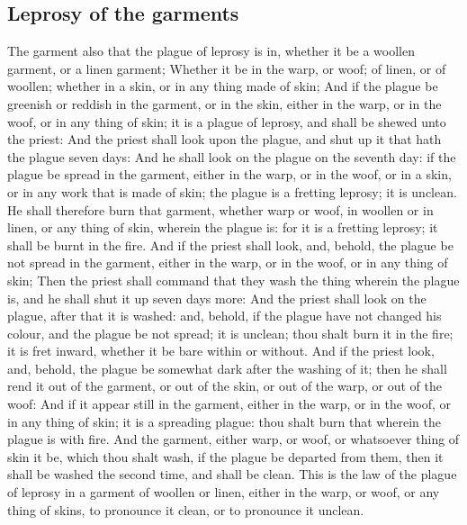 \begin{biblechapter}
\section*{Leprosy of the garments}
\verse The garment also that the plague of leprosy is in, whether it be a woollen garment, or a linen garment;
\verse Whether it be in the warp, or woof; of linen, or of woollen; whether in a skin, or in any thing made of skin;
\verse And if the plague be greenish or reddish in the garment, or in the skin, either in the warp, or in the woof, or in any thing of skin; it is a plague of leprosy, and shall be shewed unto the priest:
\verse And the priest shall look upon the plague, and shut up it that hath the plague seven days:
\verse And he shall look on the plague on the seventh day: if the plague be spread in the garment, either in the warp, or in the woof, or in a skin, or in any work that is made of skin; the plague is a fretting leprosy; it is unclean.
\verse He shall therefore burn that garment, whether warp or woof, in woollen or in linen, or any thing of skin, wherein the plague is: for it is a fretting leprosy; it shall be burnt in the fire.
\verse And if the priest shall look, and, behold, the plague be not spread in the garment, either in the warp, or in the woof, or in any thing of skin;
\verse Then the priest shall command that they wash the thing wherein the plague is, and he shall shut it up seven days more:
\verse And the priest shall look on the plague, after that it is washed: and, behold, if the plague have not changed his colour, and the plague be not spread; it is unclean; thou shalt burn it in the fire; it is fret inward, whether it be bare within or without.
\verse And if the priest look, and, behold, the plague be somewhat dark after the washing of it; then he shall rend it out of the garment, or out of the skin, or out of the warp, or out of the woof:
\verse And if it appear still in the garment, either in the warp, or in the woof, or in any thing of skin; it is a spreading plague: thou shalt burn that wherein the plague is with fire.
\verse And the garment, either warp, or woof, or whatsoever thing of skin it be, which thou shalt wash, if the plague be departed from them, then it shall be washed the second time, and shall be clean.
\verse This is the law of the plague of leprosy in a garment of woollen or linen, either in the warp, or woof, or any thing of skins, to pronounce it clean, or to pronounce it unclean.
\end{biblechapter}


